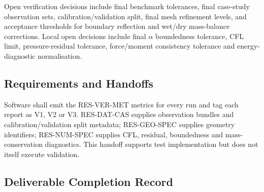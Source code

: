 
Open verification decisions include final benchmark tolerances, final
case-study observation sets, calibration/validation split, final mesh
refinement levels, and acceptance thresholds for boundary reflection and
wet/dry mass-balance corrections. Local open decisions include final
$\alpha$ boundedness tolerance, CFL limit, pressure-residual
tolerance, force/moment consistency tolerance and energy-diagnostic
normalisation.

\subsection{Requirements and Handoffs}
\label{sec:res-ver-spec-requirements}

Software shall emit the RES-VER-MET metrics for every run and tag each
report as V1, V2 or V3. RES-DAT-CAS supplies observation bundles and
calibration/validation split metadata; RES-GEO-SPEC supplies geometry
identifiers; RES-NUM-SPEC supplies CFL, residual, boundedness and
mass-conservation diagnostics. This handoff supports test
implementation but does not itself execute validation.

\subsection{Deliverable Completion Record}
\label{sec:res-ver-spec-completion-record}

%
%
%

